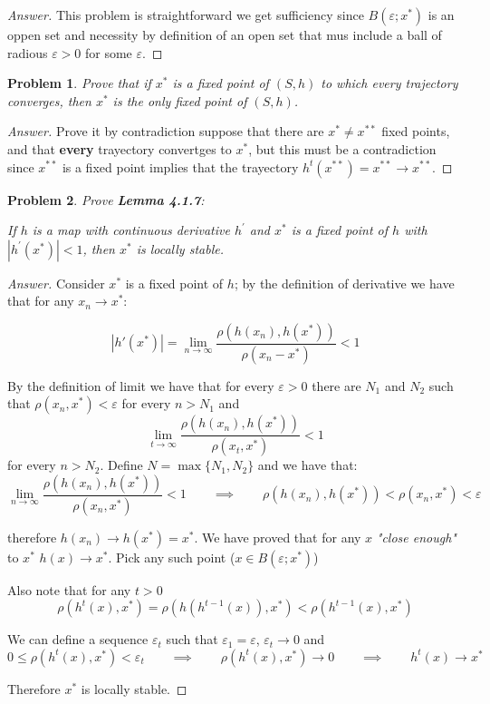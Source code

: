 \documentclass{article}
\newtheorem{problem}{Problem}[section]
\newcommand{\qiq}{\qquad \implies \qquad}
\begin{document}
\begin{proof}[Answer]
    This problem is straightforward we get sufficiency since $B(\varepsilon; x^*)$ is an oppen set and necessity by definition of an open set that mus include a ball of radious $\varepsilon>0$ for some $\varepsilon$.
\end{proof}

\begin{problem}
    Prove that if $x^{*}$ is a fixed point of $(S, h)$ to which every trajectory converges, then $x^{*}$ is the only fixed point of $(S, h)$.
\end{problem}

\begin{proof}[Answer]
    Prove it by contradiction suppose that there are $x^{*} \neq x^{**}$ fixed points, and that \textbf{every} trayectory convertges to $x^*$, but this must be a contradiction since $x^{**}$ is a fixed point implies that the trayectory $h^t(x^{**}) = x^{**}\to x^{**}$. 
\end{proof}

\begin{problem}
    Prove \textbf{Lemma 4.1.7}:
    
    If $h$ is a map with continuous derivative $h^{\prime}$ and $x^{*}$ is a fixed point of $h$ with $\left|h^{\prime}\left(x^{*}\right)\right|<1$, then $x^{*}$ is locally stable.

\end{problem}

\begin{proof}[Answer]
    Consider $x^*$ is a fixed point of $h$; by the definition of derivative we have that for any $x_n \to x^*$: 

    $$\left |h'(x^*)\right| = \lim_{n\to \infty} \frac{\rho(h(x_n) , h(x^*))}{\rho(x_n - x^*)} < 1 $$

    By the definition of limit we have that for every $\varepsilon>0$ there are $N_1$ and $N_2$ such that $\rho(x_n , x^*)<\varepsilon$ for every $n>N_1$ and  $$\lim_{t\to \infty} \frac{\rho(h(x_n) , h(x^*))}{\rho(x_t, x^*)} < 1 $$ for every $n>N_2$. Define $N = \max\{N_1,N_2\}$ and we have that:
    $$\lim_{n\to \infty} \frac{\rho(h(x_n) , h(x^*))}{\rho(x_n , x^*)} < 1 \qiq \rho(h(x_n) , h(x^*)) < \rho(x_n , x^*) < \varepsilon  $$

    therefore $h(x_n) \to h(x^*)=x^*$. We have proved that for any $x$ \textit{"close enough"} to $x^*$ $h(x)\to x^*$. Pick any such point ($x\in B(\varepsilon; x^*)$) 

    Also note that for any $t>0$
    $$\rho(h^t(x),x^*)=\rho(h(h^{t-1}(x)), x^*)<\rho(h^{t-1}(x), x^*)$$

    We can define a sequence $\varepsilon_t$ such that $\varepsilon_1 = \varepsilon$, $\varepsilon_t \to 0$ and $$0\leq \rho(h^{t}(x), x^*) < \varepsilon_t \qiq  \rho(h^{t}(x), x^*)\to 0 \qiq h^t(x) \to x^* $$
    
    Therefore $x^*$ is locally stable.

\end{proof}
\end{document}
